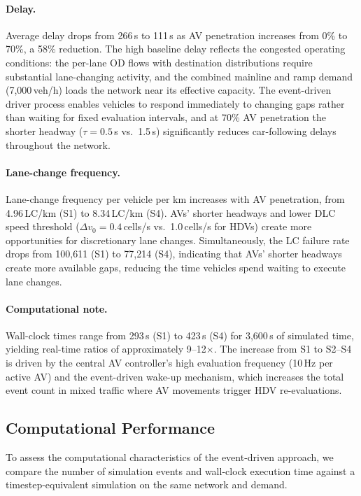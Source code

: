 \documentclass[review,authoryear]{elsarticle}
\begin{document}
\paragraph{Delay.} Average delay drops from 266\,s to 111\,s as AV penetration increases from 0\% to 70\%, a 58\% reduction. The high baseline delay reflects the congested operating conditions: the per-lane OD flows with destination distributions require substantial lane-changing activity, and the combined mainline and ramp demand (7{,}000\,veh/h) loads the network near its effective capacity. The event-driven driver process enables vehicles to respond immediately to changing gaps rather than waiting for fixed evaluation intervals, and at 70\% AV penetration the shorter headway ($\tau = 0.5$\,s vs.\ 1.5\,s) significantly reduces car-following delays throughout the network.

\paragraph{Lane-change frequency.} Lane-change frequency per vehicle per km increases with AV penetration, from 4.96\,LC/km (S1) to 8.34\,LC/km (S4). AVs' shorter headways and lower DLC speed threshold ($\Delta v_0 = 0.4$\,cells/s vs.\ 1.0\,cells/s for HDVs) create more opportunities for discretionary lane changes. Simultaneously, the LC failure rate drops from 100{,}611 (S1) to 77{,}214 (S4), indicating that AVs' shorter headways create more available gaps, reducing the time vehicles spend waiting to execute lane changes.

\paragraph{Computational note.} Wall-clock times range from 293\,s (S1) to 423\,s (S4) for 3{,}600\,s of simulated time, yielding real-time ratios of approximately 9--12$\times$. The increase from S1 to S2--S4 is driven by the central AV controller's high evaluation frequency (10\,Hz per active AV) and the event-driven wake-up mechanism, which increases the total event count in mixed traffic where AV movements trigger HDV re-evaluations.


\subsection{Computational Performance}
\label{sec:exp_performance}

To assess the computational characteristics of the event-driven approach, we compare the number of simulation events and wall-clock execution time against a timestep-equivalent simulation on the same network and demand.
\end{document}
